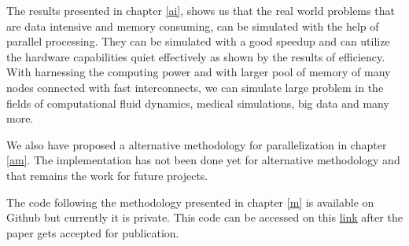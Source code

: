 The results presented in chapter \ref{ai}, shows us that the real world problems that are data intensive and memory consuming, can be simulated with the help of parallel processing. They can be simulated with a good speedup and can utilize the hardware capabilities quiet effectively as shown by the results of efficiency. With harnessing the computing power and with larger pool of memory of many nodes connected with fast interconnects, we can simulate large problem in the fields of computational fluid dynamics, medical simulations, big data and many more.  

\vspace{10pt}
\hspace{-18pt}We also have proposed a alternative methodology for parallelization in chapter \ref{am}. The implementation has not been done yet for alternative methodology and that remains the work for future projects. 

\vspace{10pt}
\hspace{-18pt}The code following the methodology presented in chapter \ref{m} is available on Github but currently it is private. This code can be accessed on this \href{https://github.com/Arpit-Babbar/TrixiLW.jl/}{link} after the paper \cite{arpit} gets accepted for publication.